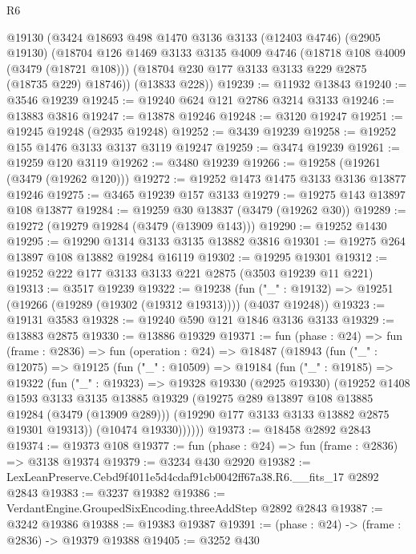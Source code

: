 \begin{lexlean}{R6}
\begin{coremodule}
    @19130
    (@3424
      @18693
      @498
      @1470
      @3136
      @3133
      (@12403 @4746)
      (@2905 @19130)
      (@18704
        @126
        @1469
        @3133
        @3135
        @4009
        @4746
        (@18718 @108 @4009 (@3479 (@18721 @108)))
        (@18704 @230 @177 @3133 @3133 @229 @2875 (@18735 @229) @18746))
      (@13833 @228))
@19239 := @11932 @13843
@19240 := @3546 @19239
@19245 := @19240 @624 @121 @2786 @3214 @3133
@19246 := @13883 @3816
@19247 := @13878 @19246
@19248 := @3120 @19247
@19251 := @19245 @19248 (@2935 @19248)
@19252 := @3439 @19239
@19258 := @19252 @155 @1476 @3133 @3137 @3119 @19247
@19259 := @3474 @19239
@19261 := @19259 @120 @3119
@19262 := @3480 @19239
@19266 := @19258 (@19261 (@3479 (@19262 @120)))
@19272 := @19252 @1473 @1475 @3133 @3136 @13877 @19246
@19275 := @3465 @19239 @157 @3133
@19279 := @19275 @143 @13897 @108 @13877
@19284 := @19259 @30 @13837 (@3479 (@19262 @30))
@19289 := @19272 (@19279 @19284 (@3479 (@13909 @143)))
@19290 := @19252 @1430
@19295 := @19290 @1314 @3133 @3135 @13882 @3816
@19301 := @19275 @264 @13897 @108 @13882 @19284 @16119
@19302 := @19295 @19301
@19312 := @19252 @222 @177 @3133 @3133 @221 @2875 (@3503 @19239 @11 @221)
@19313 := @3517 @19239
@19322 := @19238
    (fun ("_" : @19132) => @19251 (@19266 (@19289 (@19302 (@19312 @19313)))) (@4037 @19248))
@19323 := @19131 @3583
@19328 := @19240 @590 @121 @1846 @3136 @3133
@19329 := @13883 @2875
@19330 := @13886 @19329
@19371 := fun (phase : @24) =>
  fun (frame : @2836) =>
  fun (operation : @24) =>
  @18487
    (@18943
      (fun ("_" : @12075) =>
      @19125
        (fun ("_" : @10509) =>
        @19184
          (fun ("_" : @19185) =>
          @19322
            (fun ("_" : @19323) =>
            @19328
              @19330
              (@2925 @19330)
              (@19252
                @1408
                @1593
                @3133
                @3135
                @13885
                @19329
                (@19275 @289 @13897 @108 @13885 @19284 (@3479 (@13909 @289)))
                (@19290 @177 @3133 @3133 @13882 @2875 @19301 @19313))
              (@10474 @19330))))))
@19373 := @18458 @2892 @2843
@19374 := @19373 @108
@19377 := fun (phase : @24) => fun (frame : @2836) => @3138 @19374
@19379 := @3234 @430 @2920
@19382 := LexLeanPreserve.Cebd9f4011e5d4cdaf91cb0042ff67a38.R6.__fits_17 @2892 @2843
@19383 := @3237 @19382
@19386 := VerdantEngine.GroupedSixEncoding.threeAddStep @2892 @2843
@19387 := @3242 @19386
@19388 := @19383 @19387
@19391 := (phase : @24) -> (frame : @2836) -> @19379 @19388
@19405 := @3252
    @430

\end{coremodule}
\end{lexlean}

